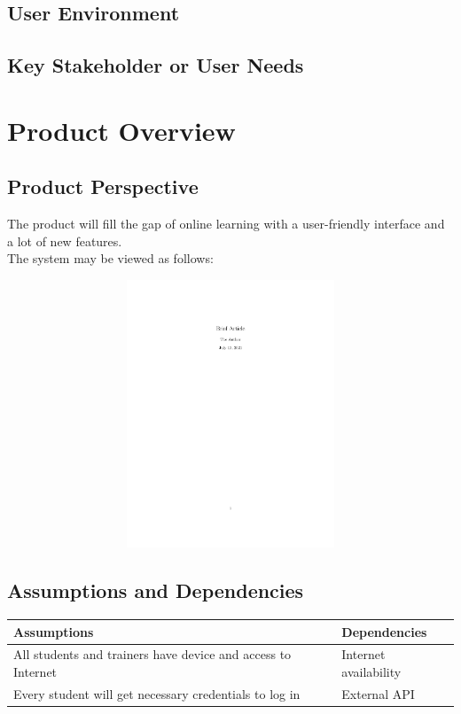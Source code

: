 \documentclass[a4paper]{article}
\begin{document}
\bigskip
\subsection{User Environment}



\bigskip
\subsection{Key Stakeholder or User Needs}



\bigskip
\section{Product Overview}
\subsection{Product Perspective}
The product will fill the gap of online learning with a user-friendly interface and a lot of new features.\\ The system may be viewed as follows: \\

\begin{figure}[h]
\includegraphics[width=12cm, height=8cm] {a1} 
\centering
\end{figure}

\bigskip
\subsection{Assumptions and Dependencies}
\begin{table}[ht]
\centering
\begin{tabular}{|p{5cm}|p{5cm}|}
\hline
Assumptions & Dependencies\\ \hline
All students and trainers have device and access to Internet & Internet availability\\ \hline
Every student will get necessary credentials to log in & External API \\
\hline
\end{tabular}
\end{table}
\end{document}
